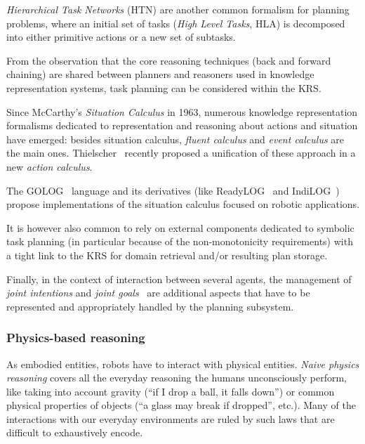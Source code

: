 \documentclass[a4paper, twocolumn]{article}
\begin{document}
\emph{Hierarchical Task Networks} (HTN) are another common formalism for
planning problems, where an initial set of tasks (\emph{High Level Tasks}, HLA)
is decomposed into either primitive actions or a new set of subtasks.

From the observation that the core reasoning techniques (back and forward
chaining) are shared between planners and reasoners used in knowledge
representation systems, task planning can be considered within the KRS.

Since McCarthy's \emph{Situation Calculus} in 1963, numerous knowledge
representation formalisms dedicated to representation and reasoning about
actions and situation have emerged: besides situation calculus, \emph{fluent
calculus} and \emph{event calculus} are the main ones.
Thielscher~\cite{Thielscher2011} recently proposed a unification of these
approach in a new \emph{action calculus}.

The GOLOG~\cite{Levesque1997} language and its derivatives (like {\sc
ReadyLOG}~\cite{Ferrein2008} and {\sc IndiLOG}~\cite{Gspandl2011}) propose
implementations of the situation calculus focused on robotic applications.


It is however also common to rely on external components dedicated to symbolic task
planning (in particular because of the non-monotonicity requirements) with a
tight link to the KRS for domain retrieval and/or resulting plan storage.

Finally, in the context of interaction between several agents, the management
of \emph{joint intentions} and \emph{joint goals}~\cite{Tomasello2005,
Dominey2011} are additional aspects that have to be represented and
appropriately handled by the planning subsystem.


\subsubsection{Physics-based reasoning}
\label{sect|physics}

As embodied entities, robots have to interact with physical entities.
\emph{Naive physics reasoning} covers all the everyday reasoning the humans
unconsciously perform, like taking into account gravity (``if I drop a ball, it
falls down'') or common physical properties of objects (``a glass may break if
dropped'', etc.). Many of the interactions with our everyday environments are
ruled by such laws that are difficult to exhaustively encode.
\end{document}
